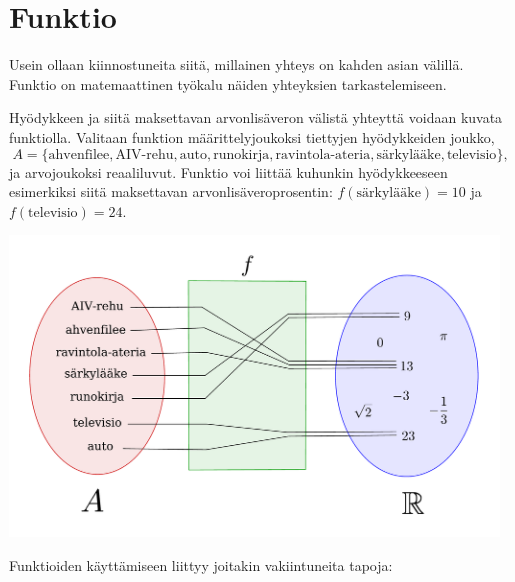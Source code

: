 \section{Funktio}

Usein ollaan kiinnostuneita siitä, millainen yhteys on kahden asian välillä.
Funktio on matemaattinen työkalu näiden yhteyksien tarkastelemiseen.



\begin{esimerkki}
	Hyödykkeen ja siitä maksettavan arvonlisäveron välistä yhteyttä voidaan kuvata funktiolla.
	Valitaan funktion määrittelyjoukoksi tiettyjen hyödykkeiden joukko,
		\[ A = \{\text{ahvenfilee}, \text{AIV-rehu}, \text{auto}, \text{runokirja},
		\text{ravintola-ateria}, \text{särkylääke}, \text{televisio}\}, \]
	ja arvojoukoksi reaaliluvut.
	Funktio voi liittää kuhunkin hyödykkeeseen esimerkiksi siitä maksettavan arvonlisäveroprosentin:
	$f(\text{särkylääke}) = 10$ ja $f(\text{televisio}) = 24$.
	
	\begin{center}
		\includegraphics[width=13cm]{pictures/funktiokone.pdf}
	\end{center}
\end{esimerkki}

Funktioiden käyttämiseen liittyy joitakin vakiintuneita tapoja:
\begin{alakohdat}
\end{alakohdat}

